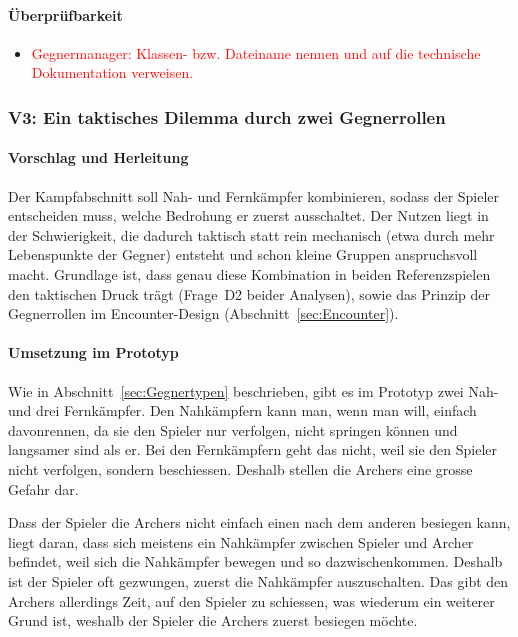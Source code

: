 \documentclass[../Main.tex]{subfiles}
\begin{document}
\paragraph{Überprüfbarkeit}
\begin{itemize}[leftmargin=1.5cm]
    \item \textcolor{red}{Gegnermanager: Klassen- bzw. Dateiname nennen und auf die technische Dokumentation verweisen.}
\end{itemize}

\subsubsection{V3: Ein taktisches Dilemma durch zwei Gegnerrollen} \label{sec:V3}

\paragraph{Vorschlag und Herleitung}
Der Kampfabschnitt soll Nah- und Fernkämpfer kombinieren, sodass der Spieler entscheiden muss, welche Bedrohung er zuerst ausschaltet. Der Nutzen liegt in der Schwierigkeit, die dadurch taktisch statt rein mechanisch (etwa durch mehr Lebenspunkte der Gegner) entsteht und schon kleine Gruppen anspruchsvoll macht. Grundlage ist, dass genau diese Kombination in beiden Referenzspielen den taktischen Druck trägt (Frage~D2 beider Analysen), sowie das Prinzip der Gegnerrollen im Encounter-Design (Abschnitt~\ref{sec:Encounter}).

\paragraph{Umsetzung im Prototyp}
Wie in Abschnitt~\ref{sec:Gegnertypen} beschrieben, gibt es im Prototyp zwei Nah- und drei Fernkämpfer. Den Nahkämpfern kann man, wenn man will, einfach davonrennen, da sie den Spieler nur verfolgen, nicht springen können und langsamer sind als er. Bei den Fernkämpfern geht das nicht, weil sie den Spieler nicht verfolgen, sondern beschiessen. Deshalb stellen die Archers eine grosse Gefahr dar.

Dass der Spieler die Archers nicht einfach einen nach dem anderen besiegen kann, liegt daran, dass sich meistens ein Nahkämpfer zwischen Spieler und Archer befindet, weil sich die Nahkämpfer bewegen und so dazwischenkommen. Deshalb ist der Spieler oft gezwungen, zuerst die Nahkämpfer auszuschalten. Das gibt den Archers allerdings Zeit, auf den Spieler zu schiessen, was wiederum ein weiterer Grund ist, weshalb der Spieler die Archers zuerst besiegen möchte.
\end{document}
